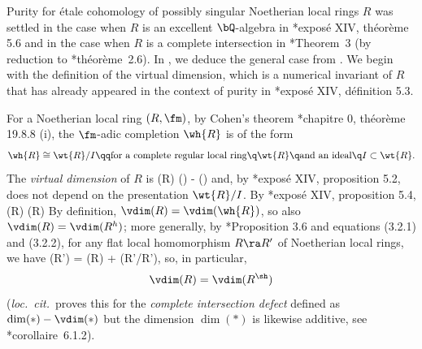 Purity for \'{e}tale cohomology of possibly singular Noetherian local rings $R$ was settled in the case when $R$ is an excellent $\bQ$-algebra in \cite{SGA2new}*{expos\'{e} XIV, th\'{e}or\`{e}me 5.6} and in the case when $R$ is a complete intersection in \cite{Gab04}*{Theorem~3} (by reduction to \cite{Ill03}*{th\'{e}or\`{e}me~2.6}). In , we deduce the general case from . We begin with the definition of the virtual dimension, which is a numerical invariant of $R$ that has already appeared in the context of purity in \cite{SGA2new}*{expos\'{e} XIV, d\'{e}finition 5.3}.









 
For a Noetherian local ring $(R, \fm)$, by Cohen's theorem \cite{EGAIV1}*{chapitre 0, th\'{e}or\`{e}me 19.8.8 (i)}, the $\fm$-adic completion $\wh{R}$ is of the form
\[%
\wh{R} \cong \wt{R}/I \qq \text{for a complete regular local ring} \q \wt{R} \q \text{and an ideal} \q I \subset \wt{R}.
\]%
The \emph{virtual dimension} of $R$ is %
\be \label{eqn:vdim-def}
\vdim(R) \ce \dim() - ()
\ee
and, by \cite{SGA2new}*{expos\'{e} XIV, proposition 5.2}, does not depend on the presentation $\wt{R}/I$. %
By \cite{SGA2new}*{expos\'{e} XIV, proposition 5.4}, %
\be \label{vdim-ineq}
\vdim(R) \le \dim(R) \q {}
\ee
By definition, $\vdim(R) = \vdim(\wh{R})$, so also $\vdim(R) = \vdim(R^h)$; %
more generally, by \cite{Avr77}*{Proposition 3.6 and equations (3.2.1) and (3.2.2)}, for any flat local homomorphism $R \ra R'$ of Noetherian local rings, we have
\be \label{vdim-add}
\vdim(R') = \vdim(R) + \vdim(R'/\fm R'),
\ee
so, in particular,
\[
\vdim(R) = \vdim(R^{\sh})
\]
(\emph{loc.~cit.}~proves this for the \emph{complete intersection defect} defined as $\dim(*) - \vdim(*)$ but the dimension $\dim(*)$ is likewise additive, see \cite{EGAIV2}*{corollaire~6.1.2}). %
\epp


